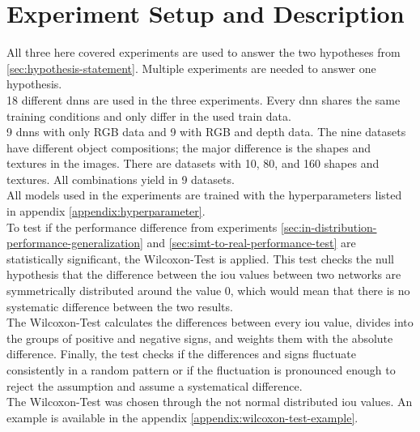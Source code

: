 \chapter{Experiment Setup and Description}
\label{chap:kapitel4}

	All three here covered experiments are used to answer the two hypotheses from \ref{sec:hypothesis-statement}. Multiple experiments are needed to answer one hypothesis.\\
	18 different \acl{dnn}s are used in the three experiments. Every \ac{dnn} shares the same training conditions and only differ in the used train data.\\
	9 \ac{dnn}s with only RGB data and 9 with RGB and depth data. The nine datasets have different object compositions; the major difference is the shapes and textures in the images. There are datasets with 10, 80, and 160 shapes and textures. All combinations yield in 9 datasets.\\
	All models used in the experiments are trained with the hyperparameters listed in appendix \ref{appendix:hyperparameter}.\\
	To test if the performance difference from experiments \ref{sec:in-distribution-performance-generalization} and \ref{sec:simt-to-real-performance-test} are statistically significant, the Wilcoxon-Test \cite{Rey2011} is applied. This test checks the null hypothesis that the difference between the \ac{iou} values between two networks are symmetrically distributed around the value 0, which would mean that there is no systematic difference between the two results.\\
	The Wilcoxon-Test calculates the differences between every \ac{iou} value, divides into the groups of positive and negative signs, and weights them with the absolute difference. Finally, the test checks if the differences and signs fluctuate consistently in a random pattern or if the fluctuation is pronounced enough to reject the assumption and assume a systematical difference.\\
	The Wilcoxon-Test was chosen through the not normal distributed \ac{iou} values. An example is available in the appendix \ref{appendix:wilcoxon-test-example}.
	
	
	
	\clearpage
